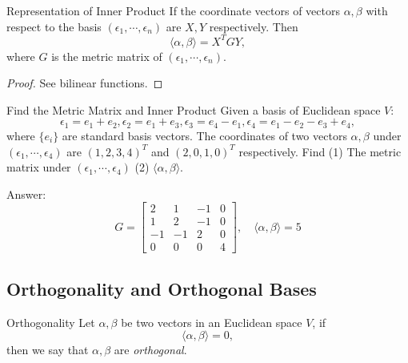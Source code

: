 \begin{proposition}{Representation of Inner Product}{}
  If the coordinate vectors of vectors $\alpha, \beta$ with respect to the basis
  $(\epsilon_1,\cdots,\epsilon_n)$ are $X, Y$ respectively.
  Then 
  \begin{equation}
    \langle \alpha, \beta \rangle = X^TGY,
  \end{equation}
  where $G$ is the metric matrix of $(\epsilon_1,\cdots,\epsilon_n)$.
\end{proposition}

\begin{proof}
  See bilinear functions.
\end{proof}

\begin{example}{Find the Metric Matrix and Inner Product}{}
  Given a basis of Euclidean space $V$:
  \begin{equation}
    \epsilon_1=e_1+e_2,\epsilon_2=e_1+e_3,\epsilon_3=e_4-e_1,\epsilon_4=e_1-e_2-e_3+e_4,
  \end{equation}
  where $\{e_i\}$ are standard basis vectors.
  The coordinates of two vectors $\alpha, \beta$ under
  $(\epsilon_1,\cdots,\epsilon_4)$ are $(1,2,3,4)^T$ and $(2,0,1,0)^T$ respectively.
  Find (1) The metric matrix under $(\epsilon_1,\cdots,\epsilon_4)$
  (2) $\langle \alpha, \beta \rangle$.
\end{example}

\begin{solution}
  Answer:
  \begin{equation}
    G=\begin{bmatrix}2&1&-1&0\\1&2&-1&0\\-1&-1&2&0\\0&0&0&4\end{bmatrix}, \quad
    \langle \alpha,\beta \rangle=5
  \end{equation}
\end{solution}

\subsection{Orthogonality and Orthogonal Bases}

\begin{definition}{Orthogonality}{}
  Let $\alpha, \beta$ be two vectors in an Euclidean space $V$,
  if
  \begin{equation}
    \langle \alpha, \beta \rangle = 0,
  \end{equation}
  then we say that $\alpha, \beta$ are \emph{orthogonal}.
\end{definition}

